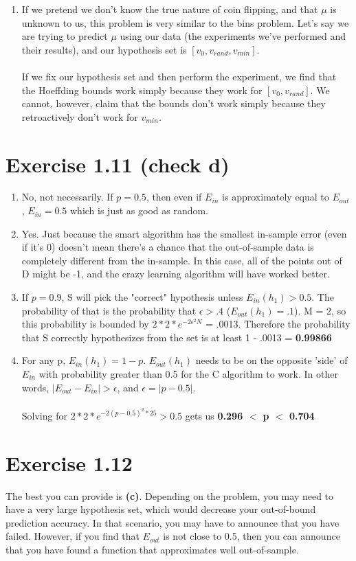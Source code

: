 \documentclass[12pt]{article}
\begin{document}
\begin{enumerate}[label=(\alph*)]
	\item If we pretend we don't know the true nature of coin flipping, and that $\mu$ is unknown to us, this problem is very similar to the bins problem. Let's say we are trying to predict $\mu$ using our data (the experiments we've performed and their results), and our hypothesis set is $[v_0, v_{rand}, v_{min}]$.
	\\ \\ If we fix our hypothesis set and then perform the experiment, we find that the Hoeffding bounds work simply because they work for $[v_0, v_{rand}]$. We cannot, however, claim that the bounds don't work simply because they retroactively don't work for $v_{min}$.
\end{enumerate}

\section*{Exercise 1.11 (check d)}
\begin{enumerate}[label=(\alph*)]
	\item No, not necessarily. If $p = 0.5$, then even if $E_{in}$ is approximately equal to $E_{out}$, $E_{in} = 0.5$ which is just as good as random.
	\item Yes. Just because the smart algorithm has the smallest in-sample error (even if it's 0) doesn't mean there's a chance that the out-of-sample data is completely different from the in-sample. In this case, all of the points out of D might be -1, and the crazy learning algorithm will have worked better.
	\item If $p = 0.9$, S will pick the "correct" hypothesis unless $E_{in}(h_1) > 0.5$. The probability of that is the probability that $\epsilon > .4$ ($E_{out}(h_1) = .1$). M = 2, so this probability is bounded by $2 * 2 * e^{-2\epsilon^2N}$ = .0013. Therefore the probability that S correctly hypothesizes from the set is at least 1 - .0013 = \textbf{0.99866}
	\item For any p, $E_{in}(h_1) = 1 - p$. $E_{out}(h_1)$ needs to be on the opposite 'side' of $E_{in}$ with probability greater than 0.5 for the C algorithm to work. In other words, $|E_{out} - E_{in}| > \epsilon$, and $\epsilon = |p - 0.5|$.
	\\ \\ Solving for $2 * 2 * e^{-2(p - 0.5)^2*25} > 0.5$ gets us \textbf{0.296 $<$ p $<$ 0.704}
\end{enumerate}

\section*{Exercise 1.12}
The best you can provide is \textbf{(c)}. Depending on the problem, you may need to have a very large hypothesis set, which would decrease your out-of-bound prediction accuracy. In that scenario, you may have to announce that you have failed. However, if you find that $E_{out}$ is not close to 0.5, then you can announce that you have found a function that approximates well out-of-sample.
\end{document}
